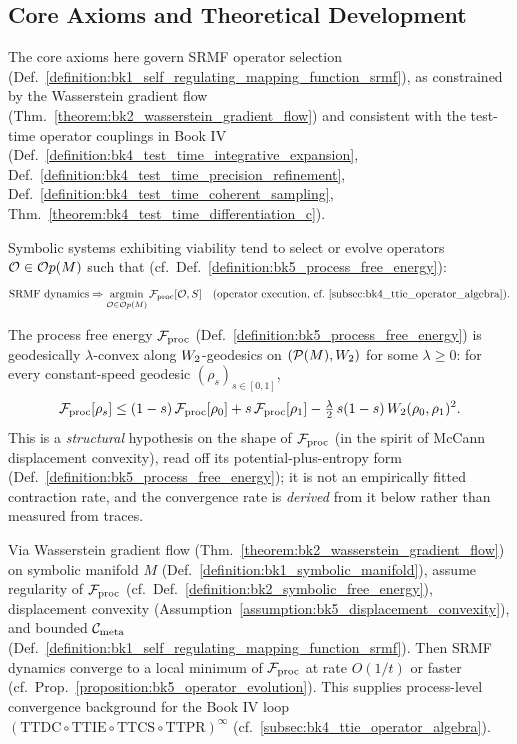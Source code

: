 \subsection{Core Axioms and Theoretical Development}
\label{subsec:bk5_srmf_core_axioms}
The core axioms here govern SRMF operator selection (Def.~\ref{definition:bk1_self_regulating_mapping_function_srmf}), as constrained by the Wasserstein gradient flow (Thm.~\ref{theorem:bk2_wasserstein_gradient_flow}) and consistent with the test-time operator couplings in Book IV (Def.~\ref{definition:bk4_test_time_integrative_expansion}, Def.~\ref{definition:bk4_test_time_precision_refinement}, Def.~\ref{definition:bk4_test_time_coherent_sampling}, Thm.~\ref{theorem:bk4_test_time_differentiation_c}).
\begin{axiom} \label{axiom:bk5_srmf_operator_selection_evolution}
Symbolic systems exhibiting viability tend to select or evolve operators $\mathcal{O} \in \mathcal{O}p(M)$ such that (cf.~Def.~\ref{definition:bk5_process_free_energy}):
\[
\text{SRMF dynamics} \Rightarrow \mathop{\mathrm{argmin}}_{\mathcal{O} \in \mathcal{O}p(M)} \mathcal{F}_{\text{proc}}[\mathcal{O}, S]
\quad \text{(operator execution, cf.~\ref{subsec:bk4_ttie_operator_algebra})}.
\]
\end{axiom}
\begin{assumption}
\label{assumption:bk5_displacement_convexity}
The process free energy $\mathcal{F}_{\text{proc}}$ (Def.~\ref{definition:bk5_process_free_energy}) is geodesically $\lambda$-convex along $W_2$-geodesics on $(\mathcal{P}(M),W_2)$ for some $\lambda \ge 0$: for every constant-speed geodesic $(\rho_s)_{s\in[0,1]}$,
\[
\mathcal{F}_{\text{proc}}[\rho_s] \le (1-s)\,\mathcal{F}_{\text{proc}}[\rho_0] + s\,\mathcal{F}_{\text{proc}}[\rho_1] - \tfrac{\lambda}{2}\,s(1-s)\,W_2(\rho_0,\rho_1)^2 .
\]
This is a \emph{structural} hypothesis on the shape of $\mathcal{F}_{\text{proc}}$ (in the spirit of McCann displacement convexity), read off its potential-plus-entropy form (Def.~\ref{definition:bk5_process_free_energy}); it is not an empirically fitted contraction rate, and the convergence rate is \emph{derived} from it below rather than measured from traces.
\end{assumption}
\begin{theorem}
\label{theorem:bk5_operator_convergence}
Via Wasserstein gradient flow (Thm.~\ref{theorem:bk2_wasserstein_gradient_flow}) on symbolic manifold $M$ (Def.~\ref{definition:bk1_symbolic_manifold}), assume regularity of $\mathcal{F}_{\text{proc}}$ (cf.~Def.~\ref{definition:bk2_symbolic_free_energy}), displacement convexity (Assumption~\ref{assumption:bk5_displacement_convexity}), and bounded $\mathcal{C}_{\text{meta}}$ (Def.~\ref{definition:bk1_self_regulating_mapping_function_srmf}).
Then SRMF dynamics converge to a local minimum of $\mathcal{F}_{\text{proc}}$ at rate $O(1/t)$ or faster (cf.~Prop.~\ref{proposition:bk5_operator_evolution}). This supplies process-level convergence background for the Book IV loop $(\mathrm{TTDC}\circ\mathrm{TTIE}\circ\mathrm{TTCS}\circ\mathrm{TTPR})^{\infty}$ (cf.~\ref{subsec:bk4_ttie_operator_algebra}).
\end{theorem}
